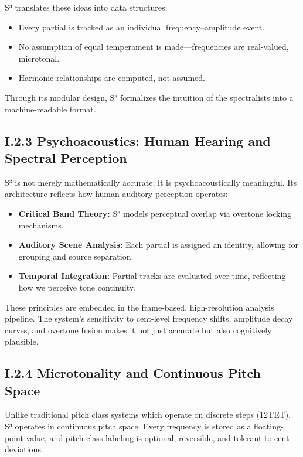 S³ translates these ideas into data structures:

\begin{itemize}
    \item Every partial is tracked as an individual frequency–amplitude event.
    \item No assumption of equal temperament is made—frequencies are real-valued, microtonal.
    \item Harmonic relationships are computed, not assumed.
\end{itemize}

Through its modular design, S³ formalizes the intuition of the spectralists into a machine-readable format.

\subsection*{I.2.3 Psychoacoustics: Human Hearing and Spectral Perception}

S³ is not merely mathematically accurate; it is psychoacoustically meaningful. Its architecture reflects how human auditory perception operates:

\begin{itemize}
    \item \textbf{Critical Band Theory:} S³ models perceptual overlap via overtone locking mechanisms.
    \item \textbf{Auditory Scene Analysis:} Each partial is assigned an identity, allowing for grouping and source separation.
    \item \textbf{Temporal Integration:} Partial tracks are evaluated over time, reflecting how we perceive tone continuity.
\end{itemize}

These principles are embedded in the frame-based, high-resolution analysis pipeline. The system's sensitivity to cent-level frequency shifts, amplitude decay curves, and overtone fusion makes it not just accurate but also cognitively plausible.

\subsection*{I.2.4 Microtonality and Continuous Pitch Space}

Unlike traditional pitch class systems which operate on discrete steps (12TET), S³ operates in continuous pitch space. Every frequency is stored as a floating-point value, and pitch class labeling is optional, reversible, and tolerant to cent deviations.

